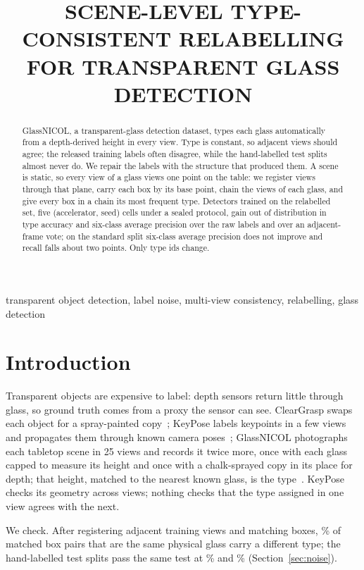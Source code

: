 \documentclass{article}
\title{SCENE-LEVEL TYPE-CONSISTENT RELABELLING FOR TRANSPARENT GLASS DETECTION}
\begin{document}
\ninept
\maketitle

\begin{abstract}
GlassNICOL, a transparent-glass detection dataset, types each glass automatically from a depth-derived height in every view. Type is constant, so adjacent views should agree; the released training labels often disagree, while the hand-labelled test splits almost never do. We repair the labels with the structure that produced them. A scene is static, so every view of a glass views one point on the table: we register views through that plane, carry each box by its base point, chain the views of each glass, and give every box in a chain its most frequent type. Detectors trained on the relabelled set, five (accelerator, seed) cells under a sealed protocol, gain out of distribution in type accuracy and six-class average precision over the raw labels and over an adjacent-frame vote; on the standard split six-class average precision does not improve and recall falls about two points. Only type ids change.
\end{abstract}

\begin{keywords}
transparent object detection, label noise, multi-view consistency, relabelling, glass detection
\end{keywords}

\section{Introduction}
\label{sec:intro}
Transparent objects are expensive to label: depth sensors return little through glass, so ground truth comes from a proxy the sensor can see. ClearGrasp swaps each object for a spray-painted copy~\cite{sajjan2020cleargrasp}; KeyPose labels keypoints in a few views and propagates them through known camera poses~\cite{liu2020keypose}; GlassNICOL photographs each tabletop scene in 25 views and records it twice more, once with each glass capped to measure its height and once with a chalk-sprayed copy in its place for depth; that height, matched to the nearest known glass, is the type~\cite{gajdosech2025glassnicol}. KeyPose checks its geometry across views; nothing checks that the type assigned in one view agrees with the next.

We check. After registering adjacent training views and matching boxes, \FlipRateReg\% of matched box pairs that are the same physical glass carry a different type; the hand-labelled test splits pass the same test at \ManStdFlipRate\% and \ManOODFlipRate\% (Section~\ref{sec:noise}).
\end{document}
